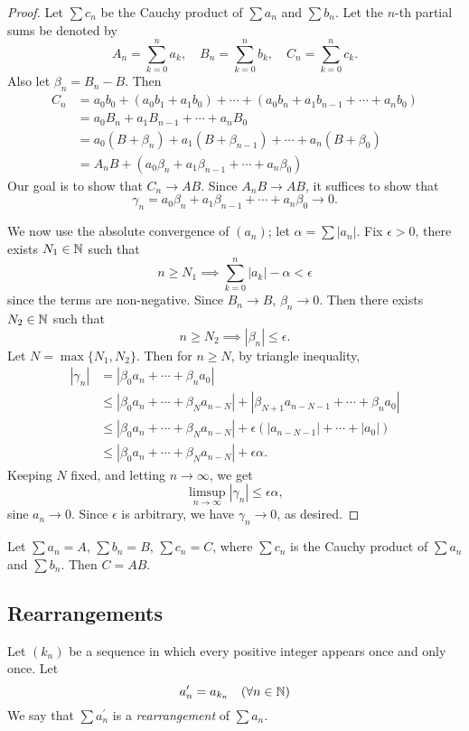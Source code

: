\begin{proof}
Let $\sum c_n$ be the Cauchy product of $\sum a_n$ and $\sum b_n$. Let the $n$-th partial sums be denoted by
\[A_n=\sum_{k=0}^{n}a_k,\quad B_n=\sum_{k=0}^{n}b_k,\quad C_n=\sum_{k=0}^{n}c_k.\]
Also let $\beta_n=B_n-B$. Then 
\begin{align*}
C_n&=a_0b_0+(a_0b_1+a_1b_0)+\cdots+(a_0b_n+a_1b_{n-1}+\cdots+a_nb_0)\\
&=a_0B_n+a_1B_{n-1}+\cdots+a_nB_0\\
&=a_0(B+\beta_n)+a_1(B+\beta_{n-1})+\cdots+a_n(B+\beta_0)\\
&=A_nB+(a_0\beta_n+a_1\beta_{n-1}+\cdots+a_n\beta_0)
\end{align*}
Our goal is to show that $C_n\to AB$. Since $A_nB\to AB$, it suffices to show that
\[\gamma_n=a_0\beta_n+a_1\beta_{n-1}+\cdots+a_n\beta_0\to0.\]

We now use the absolute convergence of $(a_n)$; let $\alpha=\sum|a_n|$. Fix $\epsilon>0$, there exists $N_1\in\mathbb N$ such that
\[n\ge N_1\implies \sum_{k=0}^{n}|a_k|-\alpha<\epsilon\]
since the terms are non-negative. Since $B_n\to B$, $\beta_n\to0$. Then there exists $N_2\in\mathbb N$ such that
\[n\ge N_2\implies|\beta_n|\le\epsilon.\]
Let $N=\max\{N_1,N_2\}$. Then for $n\ge N$, by triangle inequality,
\begin{align*}
|\gamma_n|&=|\beta_0 a_n+\cdots+\beta_n a_0|\\
&\le|\beta_0a_n+\cdots+\beta_Na_{n-N}|+|\beta_{N+1}a_{n-N-1}+\cdots+\beta_na_0|\\
&\le|\beta_0a_n+\cdots+\beta_Na_{n-N}|+\epsilon(|a_{n-N-1}|+\cdots+|a_0|)\\
&\le|\beta_0a_n+\cdots+\beta_Na_{n-N}|+\epsilon\alpha.
\end{align*}
Keeping $N$ fixed, and letting $n\to\infty$, we get
\[\limsup_{n\to\infty}|\gamma_n|\le\epsilon\alpha,\]
sine $a_n\to0$. Since $\epsilon$ is arbitrary, we have $\gamma_n\to0$, as desired.
\end{proof}

\begin{proposition}
Let $\sum a_n=A$, $\sum b_n=B$, $\sum c_n=C$, where $\sum c_n$ is the Cauchy product of $\sum a_n$ and $\sum b_n$. Then $C=AB$.
\end{proposition}
\pagebreak

\subsection{Rearrangements}
\begin{definition}[Rearrangement]\label{defn:rearrangement-series}
Let $(k_n)$ be a sequence in which every positive integer appears once and only once. Let
\[a_n^\prime=a_{k_n}\quad(\forall n\in\mathbb N)\]
We say that $\sum a_n^\prime$ is a \emph{rearrangement} of $\sum a_n$.
\end{definition}

